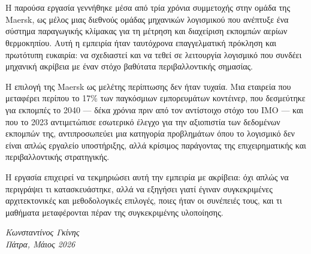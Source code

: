 \chapter*{\prefacename}

Η παρούσα εργασία γεννήθηκε μέσα από τρία χρόνια συμμετοχής στην ομάδα  της Maersk, ως μέλος μιας διεθνούς ομάδας μηχανικών λογισμικού που ανέπτυξε ένα σύστημα παραγωγικής κλίμακας για τη μέτρηση και διαχείριση εκπομπών αερίων θερμοκηπίου. Αυτή η εμπειρία ήταν ταυτόχρονα επαγγελματική πρόκληση και πρωτότυπη ευκαιρία: να σχεδιαστεί και να τεθεί σε λειτουργία λογισμικό που συνδέει μηχανική ακρίβεια με έναν στόχο βαθύτατα περιβαλλοντικής σημασίας.

Η επιλογή της Maersk ως μελέτης περίπτωσης δεν ήταν τυχαία. Μια εταιρεία που μεταφέρει περίπου το 17\% των παγκόσμιων εμπορευμάτων κοντέινερ, που δεσμεύτηκε για  εκπομπές το 2040 --- δέκα χρόνια πριν από τον αντίστοιχο στόχο του ΙΜΟ --- και που το 2023 αντιμετώπισε εσωτερικό έλεγχο για την αξιοπιστία των δεδομένων εκπομπών της, αντιπροσωπεύει μια κατηγορία προβλημάτων όπου το λογισμικό δεν είναι απλώς εργαλείο υποστήριξης, αλλά κρίσιμος παράγοντας της επιχειρηματικής και περιβαλλοντικής στρατηγικής.

Η εργασία επιχειρεί να τεκμηριώσει αυτή την εμπειρία με ακρίβεια: όχι απλώς να περιγράψει τι κατασκευάστηκε, αλλά να εξηγήσει γιατί έγιναν συγκεκριμένες αρχιτεκτονικές και μεθοδολογικές επιλογές, ποιες ήταν οι συνέπειές τους, και τι μαθήματα μεταφέρονται πέραν της συγκεκριμένης υλοποίησης.

\begin{flushright}
\textit{Κωνσταντίνος Γκίνης}\\
\textit{Πάτρα, Μάιος 2026}
\end{flushright}
